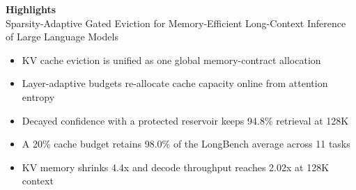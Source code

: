 \documentclass[11pt,a4paper]{article}
\begin{document}
\begin{center}
  {\large\bfseries Highlights}\\[0.4em]
  {\normalsize Sparsity-Adaptive Gated Eviction for Memory-Efficient
   Long-Context Inference of Large Language Models}
\end{center}

\vspace{1.2em}

\begin{itemize}[leftmargin=1.8em, itemsep=6pt]

\item KV cache eviction is unified as one global memory-contract allocation
\item Layer-adaptive budgets re-allocate cache capacity online from attention entropy
\item Decayed confidence with a protected reservoir keeps 94.8\% retrieval at 128K
\item A 20\% cache budget retains 98.0\% of the LongBench average across 11 tasks
\item KV memory shrinks 4.4x and decode throughput reaches 2.02x at 128K context
\end{itemize}
\end{document}
